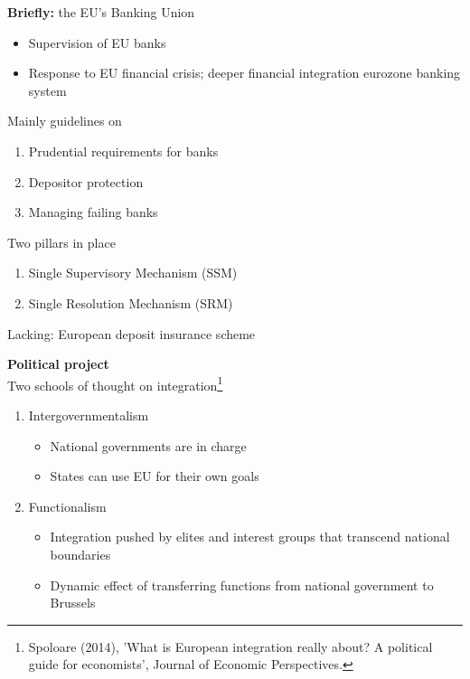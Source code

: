 \documentclass{beamer}
\begin{document}
\begin{frame}
  \textbf{Briefly:} the EU's Banking Union
  \begin{itemize}
    \item Supervision of EU banks
    \item Response to EU financial crisis; deeper financial integration eurozone banking system    
  \end{itemize}
  \medskip
  Mainly guidelines on 
  \begin{enumerate}[i]
    \item Prudential requirements for banks
    \item Depositor protection
    \item Managing failing banks
  \end{enumerate}
  \medskip
  Two pillars in place
  \begin{enumerate}
    \item Single Supervisory Mechanism (SSM)
    \item Single Resolution Mechanism (SRM)
  \end{enumerate}
  Lacking: European deposit insurance scheme
\end{frame}


\begin{frame}
  \textbf{Political project}\\
  Two schools of thought on integration\footnote{Spoloare (2014), 'What is European integration really about? A political guide for economists', Journal of Economic Perspectives.}
  \begin{enumerate}
    \item Intergovernmentalism
    \begin{itemize}
      \item National governments are in charge
      \item States can use EU for their own goals
    \end{itemize}
    \medskip
    \item Functionalism
    \begin{itemize}
      \item Integration pushed by elites and interest groups that transcend national boundaries
      \item Dynamic effect of transferring functions from national government to Brussels
    \end{itemize}
  \end{enumerate}
\end{frame}
\end{document}
